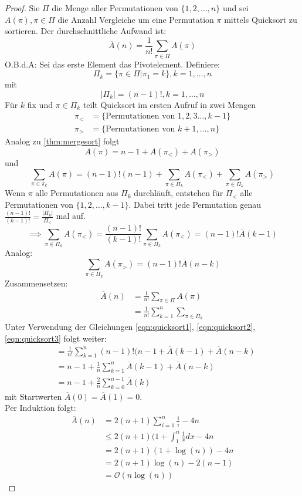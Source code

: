 \begin{proof}
Sie $\Pi$ die Menge aller Permutationen von $\{1,2,\ldots,n\}$ und sei $A(\pi), \pi \in \Pi$ die Anzahl Vergleiche um eine Permutation $\pi$ mittels Quicksort zu sortieren. Der durchschnittliche Aufwand ist:
\[
\overline{A}(n)=\frac{1}{n!} \sum_{\pi \in \Pi}A(\pi)
\]
O.B.d.A: Sei das erste Element das Pivotelement. Definiere:
\[
\Pi_k = \{\pi \in  \Pi | \pi_1=k \}, k=1,\ldots,n 
\]
mit
\[
|\Pi_k| =(n-1)!, k=1,\ldots,n
\]
Für $k$ fix und $\pi \in \Pi_k$ teilt Quicksort im ersten Aufruf in zwei Mengen
\begin{align*}
	\pi_< &= \{\text{Permutationen von } 1,2,3\ldots,k-1\} \\
	\pi_> &= \{\text{Permutationen von } k+1,\ldots,n\}  
\end{align*}
Analog zu \ref{thm:mergesort} folgt
\[
A(\pi) = n-1+ A(\pi_<) + A(\pi_>)
\]
und
\begin{equation}
	\label{eqn:quicksort1}
\sum_{\pi \in  \pi_k} A(\pi) = (n-1)! (n-1) + \sum_{\pi \in  \Pi_k} A(\pi_<)+ \sum_{\pi \in \Pi_k}A(\pi_>)
\end{equation}
Wenn $\pi$ alle Permutationen aus $\Pi_k$ durchläuft, entstehen für $\Pi_<$ alle Permutationen von $\{1,2,\ldots,k-1\}$. 
Dabei tritt jede Permutation genau $\frac{(n-1)!}{(k-1)!}= \frac{|\Pi_k|}{\Pi_<}$ mal auf.
\begin{equation}
\label{eqn:quicksort2}
\implies \sum_{\pi \in \Pi_k} A(\pi_<) = \frac{(n-1)!}{(k-1)!} \sum_{\pi \in \Pi_k}A(\pi_<) = 
(n-1)!  \overline{A}(k-1)
\end{equation}
Analog:
\begin{equation}
\label{eqn:quicksort3}
\sum_{\pi \in \Pi_k}A(\pi_>)= (n-1)! \overline{A}(n-k)
\end{equation}
Zusammensetzen: 
\begin{align*}
\overline{A}(n)
&= \frac{1}{n!}\sum_{\pi \in  \Pi}A(\pi) \\
&= \frac{1}{n!}\sum_{k=1}^{n}\sum_{\pi \in \Pi_k}
\end{align*}
Unter Verwendung der Gleichungen \ref{eqn:quicksort1}, \ref{eqn:quicksort2}, \ref{eqn:quicksort3} folgt weiter:
\begin{align*}
&=\frac{1}{n!}\sum_{k=1}^{n}(n-1)! (n-1 + \overline{A}(k-1) +\overline{A}(n-k) \\
&= n-1+\frac{1}{n}\sum_{k=1}^{n}\overline{A}(k-1) +\overline{A}(n-k) \\
&= n-1 + \frac{2}{n}\sum_{k=0}^{n-1}\overline{A}(k)
\end{align*}
mit Startwerten $\overline{A}(0)=\overline{A}(1)=0$. \\
Per Induktion folgt:
\begin{align*}
\overline{A}(n) 
&= 2(n+1) \sum_{i=1}^{n}\frac{1}{i}-4n \\
&\le 2(n+1) (1+ \int_{1}^{n} \frac{1}{x}dx -4n \\
&= 2(n+1) (1+\log(n)) -4n \\
&= 2(n+1) \log(n) -2(n-1) \\
&= \mathcal{O}(n\log(n))
\end{align*}
\end{proof}
